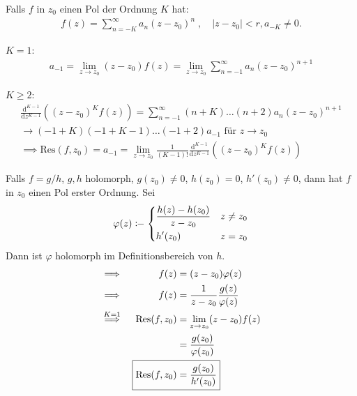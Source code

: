 \documentclass[a4paper,10pt]{scrbook}
\begin{document}
\begin{theorem}[Residuenberechnung] \label{thm:4.17}
  \begin{enum-arab}
    \item Falls $f$ in $z_0$ einen Pol der Ordnung $K$ hat:
    \begin{align*}
      f(z) = \sum\limits_{n=-K}^{\infty} a_n (z-z_0)^n \; , \quad |z-z_0| < r, a_{-K} \neq 0 .
    \end{align*}
    \begin{enum-alph}
      \item $K=1$:
      \begin{align*}
        \boxed{a_{-1} = \lim\limits_{z \to z_0} (z-z_0) f(z)} = \lim\limits_{z \to z_0} \sum\limits_{n=-1}^{\infty} a_n (z-z_0)^{n+1}
      \end{align*}

      \item $K \geq 2$:
      \begin{gather*}
        \frac{\mathrm{d}^{K-1}}{\mathrm{d}z^{K-1}} \left( (z-z_0)^K f(z) \right)
        = \sum\limits_{n=-1}^{\infty} (n+K) \ldots (n+2) a_n (z-z_0)^{n+1} \\
        \to (-1+K)(-1+K-1)\ldots(-1+2) a_{-1} \text{ für } z \to z_0 \\
        \implies \boxed{\mathrm{Res}(f,z_0) = a_{-1} = \lim\limits_{z \to z_0} \frac{1}{(K-1)!} \frac{\mathrm{d}^{K-1}}{\mathrm{d}z^{K-1}} \left( (z-z_0)^K f(z) \right)}
      \end{gather*}
    \end{enum-alph}

    \item Falls $f = g/h$, $g,h$ holomorph, $g(z_0) \neq 0$, $h(z_0) = 0$, $h'(z_0) \neq 0$, dann hat $f$ in $z_0$ einen Pol erster Ordnung. Sei
    \begin{align*}
      \varphi(z) \coloneq
      \begin{dcases}
        \frac{h(z) - h(z_0)}{z - z_0} & z \neq z_0 \\
        h'(z_0) & z = z_0
      \end{dcases}
    \end{align*}
    Dann ist $\varphi$ holomorph im Definitionsbereich von $h$.
    \begin{align*}
      \implies&& f(z) &= (z-z_0) \varphi(z) \\
      \implies&& f(z) &= \frac{1}{z-z_0} \frac{g(z)}{\varphi(z)} \\
      \overset{K=1}{\implies}&& \mathrm{Res}(f,z_0) &= \lim\limits_{z \to z_0} (z-z_0) f(z) \\
      &&&= \frac{g(z_0)}{\varphi(z_0)} \\
      && \Aboxed{\mathrm{Res}(f,z_0) &= \frac{g(z_0)}{h'(z_0)}}
    \end{align*}
  \end{enum-arab}
\end{theorem}
\end{document}
